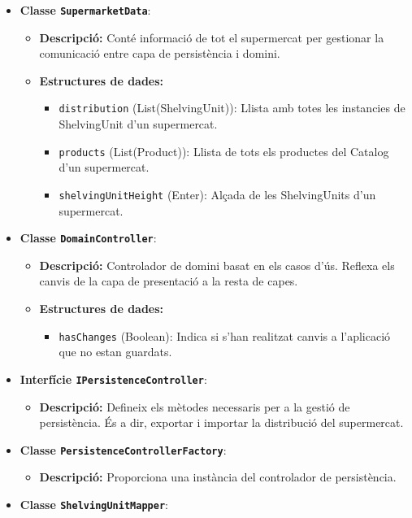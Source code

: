 \documentclass[a4paper,12pt]{report}
\begin{document}
\begin{itemize}
\begin{itemize}
\begin{itemize}
		\end{itemize}
\item \textbf {Classe \texttt{SupermarketData}}:
		\begin{itemize}
			\item \textbf{Descripció:} Conté informació de tot el supermercat per gestionar la comunicació entre capa de persistència i domini. 
			\item \textbf{Estructures de dades:}
				\begin{itemize}
					\item \texttt{distribution} (List(ShelvingUnit)): Llista amb totes les instancies de ShelvingUnit d'un supermercat.
					\item \texttt{products} (List(Product)): Llista de tots els productes del Catalog d'un supermercat.
					\item \texttt{shelvingUnitHeight} (Enter): Alçada de les ShelvingUnits d'un supermercat.
					\end{itemize}
		\end{itemize}
\item \textbf{Classe \texttt{DomainController}}:
		\begin{itemize}
			\item \textbf{Descripció:} Controlador de domini basat en els casos d'ús. Reflexa els canvis de la capa de presentació a la resta de capes.  
			\item \textbf{Estructures de dades:}
			\begin{itemize}
				\item \texttt{hasChanges} (Boolean): Indica si s'han realitzat canvis a l'aplicació que no estan guardats.
			\end{itemize}
		\end{itemize}
\item \textbf{Interfície \texttt{IPersistenceController}}:
		\begin{itemize}
			\item \textbf{Descripció:} Defineix els mètodes necessaris per a la gestió de persistència. És a dir, exportar i importar la distribució del supermercat.
		\end{itemize}
\item \textbf{Classe \texttt{PersistenceControllerFactory}}:
		\begin{itemize}
			\item \textbf{Descripció:} Proporciona una instància del controlador de persistència.
		\end{itemize}
\item \textbf{Classe \texttt{ShelvingUnitMapper}}:

\end{itemize}
\end{itemize}
\end{document}
